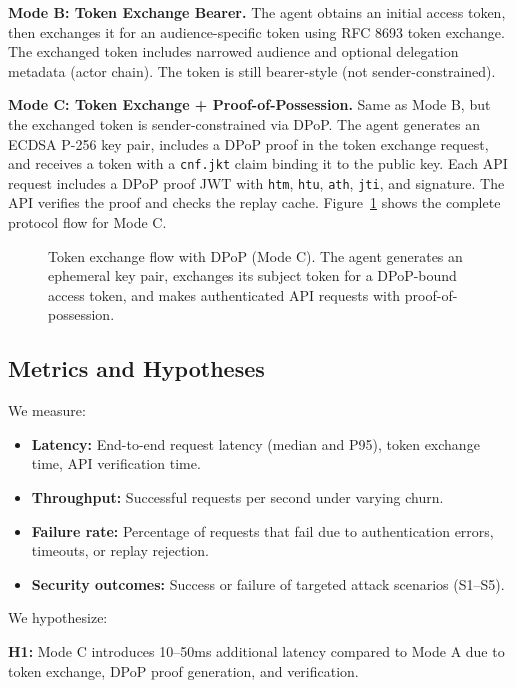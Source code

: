 \documentclass[conference,10pt]{IEEEtran}
\begin{document}
\textbf{Mode B: Token Exchange Bearer.}
The agent obtains an initial access token, then exchanges it for an audience-specific token using RFC 8693 token exchange. The exchanged token includes narrowed audience and optional delegation metadata (actor chain). The token is still bearer-style (not sender-constrained).

\textbf{Mode C: Token Exchange + Proof-of-Possession.}
Same as Mode B, but the exchanged token is sender-constrained via DPoP. The agent generates an ECDSA P-256 key pair, includes a DPoP proof in the token exchange request, and receives a token with a \texttt{cnf.jkt} claim binding it to the public key. Each API request includes a DPoP proof JWT with \texttt{htm}, \texttt{htu}, \texttt{ath}, \texttt{jti}, and signature. The API verifies the proof and checks the replay cache. Figure~\ref{fig:sequence} shows the complete protocol flow for Mode C.

\begin{figure}[t]
\centering

\caption{Token exchange flow with DPoP (Mode C). The agent generates an ephemeral key pair, exchanges its subject token for a DPoP-bound access token, and makes authenticated API requests with proof-of-possession.}
\label{fig:sequence}
\end{figure}

\subsection{Metrics and Hypotheses}

We measure:
\begin{itemize}
    \item \textbf{Latency:} End-to-end request latency (median and P95), token exchange time, API verification time.
    \item \textbf{Throughput:} Successful requests per second under varying churn.
    \item \textbf{Failure rate:} Percentage of requests that fail due to authentication errors, timeouts, or replay rejection.
    \item \textbf{Security outcomes:} Success or failure of targeted attack scenarios (S1--S5).
\end{itemize}

We hypothesize:

\textbf{H1:} Mode C introduces 10--50ms additional latency compared to Mode A due to token exchange, DPoP proof generation, and verification.
\end{document}
